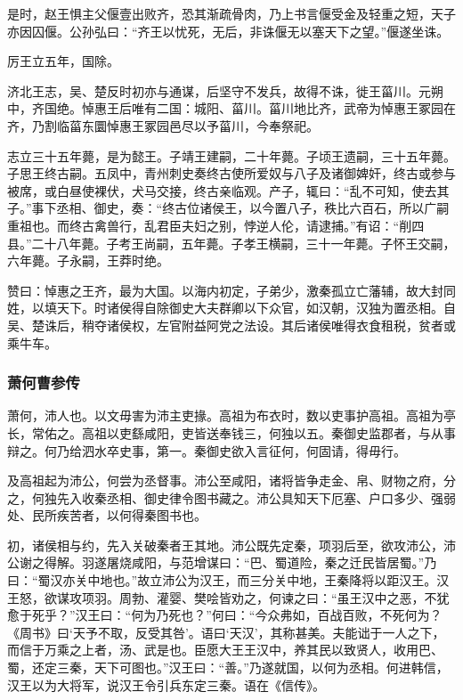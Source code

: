 \documentclass[]{article}
\begin{document}
是时，赵王惧主父偃壹出败齐，恐其渐疏骨肉，乃上书言偃受金及轻重之短，天子亦因囚偃。公孙弘曰：``齐王以忧死，无后，非诛偃无以塞天下之望。''偃遂坐诛。

厉王立五年，国除。

济北王志，吴、楚反时初亦与通谋，后坚守不发兵，故得不诛，徙王菑川。元朔中，齐国绝。悼惠王后唯有二国：城阳、菑川。菑川地比齐，武帝为悼惠王冢园在齐，乃割临菑东圜悼惠王冢园邑尽以予菑川，今奉祭祀。

志立三十五年薨，是为懿王。子靖王建嗣，二十年薨。子顷王遗嗣，三十五年薨。子思王终古嗣。五凤中，青州刺史奏终古使所爱奴与八子及诸御婢奸，终古或参与被席，或白昼使裸伏，犬马交接，终古亲临观。产子，辄曰：``乱不可知，使去其子。''事下丞相、御史，奏：``终古位诸侯王，以今置八子，秩比六百石，所以广嗣重祖也。而终古禽兽行，乱君臣夫妇之别，悖逆人伦，请逮捕。''有诏：``削四县。''二十八年薨。子考王尚嗣，五年薨。子孝王横嗣，三十一年薨。子怀王交嗣，六年薨。子永嗣，王莽时绝。

赞曰：悼惠之王齐，最为大国。以海内初定，子弟少，激秦孤立亡藩辅，故大封同姓，以填天下。时诸侯得自除御史大夫群卿以下众官，如汉朝，汉独为置丞相。自吴、楚诛后，稍夺诸侯权，左官附益阿党之法设。其后诸侯唯得衣食租税，贫者或乘牛车。

\hypertarget{header-n3733}{%
\subsubsection{萧何曹参传}\label{header-n3733}}

萧何，沛人也。以文毋害为沛主吏掾。高祖为布衣时，数以吏事护高祖。高祖为亭长，常佑之。高祖以吏繇咸阳，吏皆送奉钱三，何独以五。秦御史监郡者，与从事辩之。何乃给泗水卒史事，第一。秦御史欲入言征何，何固请，得毋行。

及高祖起为沛公，何尝为丞督事。沛公至咸阳，诸将皆争走金、帛、财物之府，分之，何独先入收秦丞相、御史律令图书藏之。沛公具知天下厄塞、户口多少、强弱处、民所疾苦者，以何得秦图书也。

初，诸侯相与约，先入关破秦者王其地。沛公既先定秦，项羽后至，欲攻沛公，沛公谢之得解。羽遂屠烧咸阳，与范增谋曰：``巴、蜀道险，秦之迁民皆居蜀。''乃曰：``蜀汉亦关中地也。''故立沛公为汉王，而三分关中地，王秦降将以距汉王。汉王怒，欲谋攻项羽。周勃、灌婴、樊哙皆劝之，何谏之曰：``虽王汉中之恶，不犹愈于死乎？''汉王曰：``何为乃死也？''何曰：``今众弗如，百战百败，不死何为？《周书》曰`天予不取，反受其咎'。语曰`天汉'，其称甚美。夫能诎于一人之下，而信于万乘之上者，汤、武是也。臣愿大王王汉中，养其民以致贤人，收用巴、蜀，还定三秦，天下可图也。''汉王曰：``善。''乃遂就国，以何为丞相。何进韩信，汉王以为大将军，说汉王令引兵东定三秦。语在《信传》。
\end{document}

